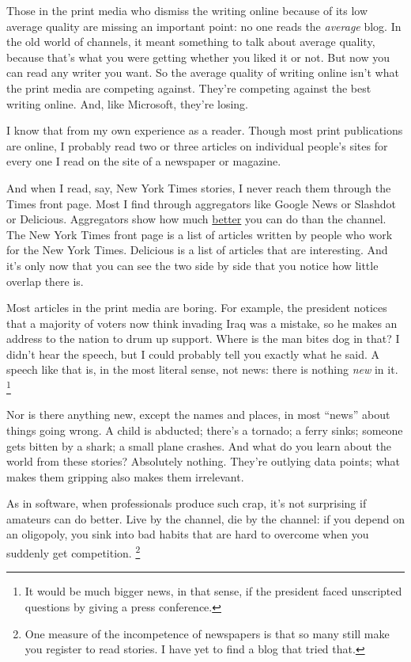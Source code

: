 \documentclass[12pt]{book}
\begin{document}
Those in the print media who dismiss the writing online because of its
low average quality are missing an important point: no one reads the
\emph{average} blog. In the old world of channels, it meant something to
talk about average quality, because that's what you were getting whether
you liked it or not. But now you can read any writer you want. So the
average quality of writing online isn't what the print media are
competing against. They're competing against the best writing online.
And, like Microsoft, they're losing.

I know that from my own experience as a reader. Though most print
publications are online, I probably read two or three articles on
individual people's sites for every one I read on the site of a
newspaper or magazine.

And when I read, say, New York Times stories, I never reach them through
the Times front page. Most I find through aggregators like Google News
or Slashdot or Delicious. Aggregators show how much
\href{http://reddit.com}{better} you can do than the channel. The New
York Times front page is a list of articles written by people who work
for the New York Times. Delicious is a list of articles that are
interesting. And it's only now that you can see the two side by side
that you notice how little overlap there is.

Most articles in the print media are boring. For example, the president
notices that a majority of voters now think invading Iraq was a mistake,
so he makes an address to the nation to drum up support. Where is the
man bites dog in that? I didn't hear the speech, but I could probably
tell you exactly what he said. A speech like that is, in the most
literal sense, not news: there is nothing \emph{new} in it.
\footnote{It would be much bigger news, in that sense, if the president
faced unscripted questions by giving a press conference.}

Nor is there anything new, except the names and places, in most ``news''
about things going wrong. A child is abducted; there's a tornado; a
ferry sinks; someone gets bitten by a shark; a small plane crashes. And
what do you learn about the world from these stories? Absolutely
nothing. They're outlying data points; what makes them gripping also
makes them irrelevant.

As in software, when professionals produce such crap, it's not
surprising if amateurs can do better. Live by the channel, die by the
channel: if you depend on an oligopoly, you sink into bad habits that
are hard to overcome when you suddenly get competition.
\footnote{One measure of the incompetence of newspapers is that so many
still make you register to read stories. I have yet to find a blog that
tried that.}
\end{document}
